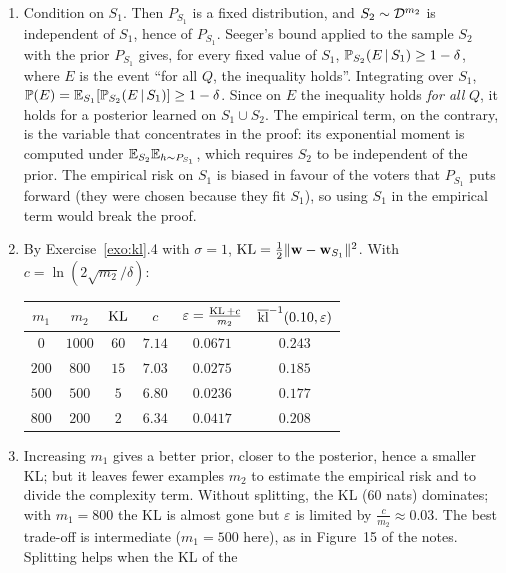 \documentclass[11pt]{article}
\newcounter{exo}
\begin{document}
\begin{solution}
\begin{enumerate}
\item Condition on $S_1$. Then $P_{S_1}$ is a fixed distribution, and $S_2\sim\D^{m_2}$ is independent of $S_1$, hence of
      $P_{S_1}$. Seeger's bound applied to the sample $S_2$ with the prior $P_{S_1}$ gives, for every fixed value of $S_1$,
      $\P_{S_2}(E\,|\,S_1)\geq1-\delta$, where $E$ is the event ``for all $Q$, the inequality holds''. Integrating over $S_1$,
      $\P(E)=\E_{S_1}[\P_{S_2}(E\,|\,S_1)]\geq1-\delta$. Since on $E$ the inequality holds \emph{for all} $Q$, it holds for a
      posterior learned on $S_1\cup S_2$. The empirical term, on the contrary, is the variable that concentrates in the
      proof: its exponential moment is computed under $\E_{S_2}\E_{h\sim P_{S_1}}$, which requires $S_2$ to be independent
      of the prior. The empirical risk on $S_1$ is biased in favour of the voters that $P_{S_1}$ puts forward (they were
      chosen because they fit $S_1$), so using $S_1$ in the empirical term would break the proof.
\item By Exercise~\ref{exo:kl}.4 with $\sigma=1$, $\KL=\frac12\|\mathbf w-\mathbf w_{S_1}\|^2$. With $c=\ln(2\sqrt{m_2}/\delta)$:
      \begin{center}
      \begin{tabular}{cccccc}\toprule
      $m_1$ & $m_2$ & $\KL$ & $c$ & $\varepsilon=\frac{\KL+c}{m_2}$ & $\klup(0.10,\varepsilon)$\\\midrule
      $0$ & $1000$ & $60$ & $7.14$ & $0.0671$ & $0.243$\\
      $200$ & $800$ & $15$ & $7.03$ & $0.0275$ & $0.185$\\
      $500$ & $500$ & $5$ & $6.80$ & $0.0236$ & $\mathbf{0.177}$\\
      $800$ & $200$ & $2$ & $6.34$ & $0.0417$ & $0.208$\\\bottomrule
      \end{tabular}
      \end{center}
\item Increasing $m_1$ gives a better prior, closer to the posterior, hence a smaller KL; but it leaves fewer examples
      $m_2$ to estimate the empirical risk and to divide the complexity term. Without splitting, the KL ($60$ nats)
      dominates; with $m_1=800$ the KL is almost gone but $\varepsilon$ is limited by $\frac{c}{m_2}\approx0.03$. The best
      trade-off is intermediate ($m_1=500$ here), as in Figure~15 of the notes. Splitting helps when the KL of the

\end{enumerate}
\end{solution}
\end{document}
